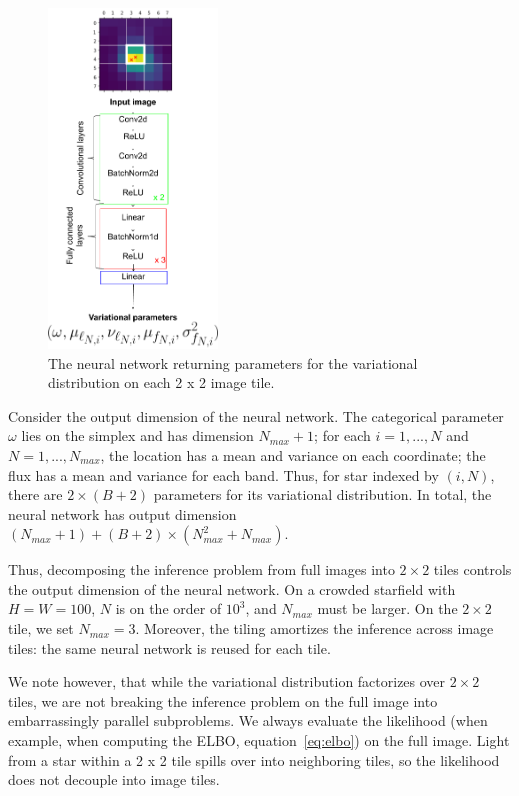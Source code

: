 \begin{figure}[!h]
    \centering
    \includegraphics[width=0.4\textwidth]{figures/starnet_archetecture2.png}
    \vspace{-0.5cm}
    \caption{The neural network returning parameters for the variational distribution on each 2 x 2 image tile.}
    \label{fig:starnet_arch}
\end{figure}

Consider the output dimension of the neural network. The categorical parameter $\omega$ lies on the 
simplex and has dimension $N_{max} + 1$; for each $i = 1, ..., N$ and $N = 1, ..., N_{max}$, the location has a mean and variance on each coordinate; the flux has a mean and variance for each band. Thus, for star indexed by $(i, N)$, 
there are $2 \times (B + 2)$ parameters for its variational distribution. In total, the neural network has output dimension $(N_{max} + 1) + (B + 2) \times (N_{max}^2 + N_{max})$. 

Thus, decomposing the inference problem from full images into $2 \times 2$ tiles controls the output dimension of the neural network. 
On a crowded starfield with $H = W = 100$, $N$ is on the order of $10^3$, 
and $N_{max}$ must be larger. 
On the $2\times 2$ tile, we set $N_{max} = 3$. 
Moreover, the tiling amortizes the inference across image tiles: the same neural network is reused for each tile. 

We note however, that while the variational distribution factorizes over $2 \times 2$ tiles, we are not breaking the inference problem on the full image into embarrassingly parallel subproblems. We always evaluate the likelihood (when example, when computing the ELBO, equation~\eqref{eq:elbo}) on the full image. 
Light from a star within a 2 x 2 tile spills over into neighboring tiles, so the likelihood does not decouple into image tiles. 
